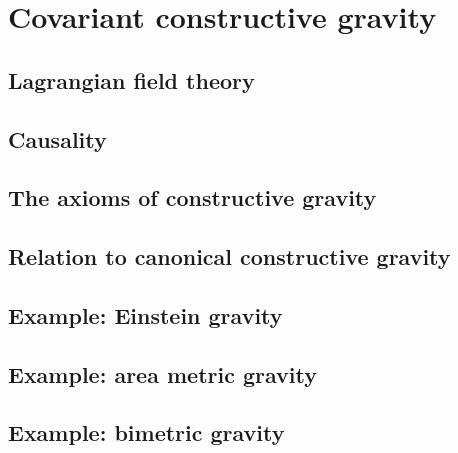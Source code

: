 \chapter{Covariant constructive gravity}

\section{Lagrangian field theory}

\section{Causality}

\section{The axioms of constructive gravity}

\section{Relation to canonical constructive gravity}

\section{Example: Einstein gravity}
\section{Example: area metric gravity}
\section{Example: bimetric gravity}

